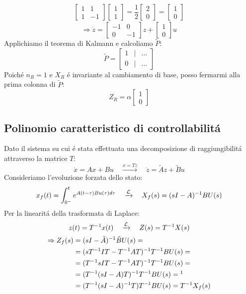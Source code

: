 \documentclass[../main.tex]{subfiles}
\begin{document}
\begin{Exercise}[title={Calcolo di $ X_R $ e decomposizione di raggiungibilit\'a}, difficulty=1]
\begin{align*}
\begin{bmatrix}
					1 & 1\\
					1 & -1
				\end{bmatrix}
				\begin{bmatrix}
					1\\
					1
				\end{bmatrix} = \dfrac{1}{2}
				\begin{bmatrix}
					2\\
					0
				\end{bmatrix}=
				\begin{bmatrix}
					1\\
					0
				\end{bmatrix}
			\end{align*}
			\[
				\Rightarrow \dot z=
				\begin{bmatrix}
					-1 & 0\\
					0 & -1
				\end{bmatrix} z +
				\begin{bmatrix}
					1\\
					0
				\end{bmatrix} u
			\]
			Applichiamo il teorema di Kalmann e calcoliamo $ \tilde P $:
			\[
				\tilde P =
				\begin{bmatrix}
					1 & | & \dots\\
					0 & | & \dots
				\end{bmatrix}
			\]
			Poich\'e $ n_R = 1 $ e $ X_R $ \'e invariante al cambiamento di base, posso fermarmi alla prima colonna di $ \tilde P $:
			\[
				Z_R = \alpha
				\begin{bmatrix}
					1\\
					0
				\end{bmatrix}
			\]
		\end{Exercise}
	
	\subsection{Polinomio caratteristico di controllabilit\'a}
		Dato il sistema su cui \'e stata effettuata una decomposizione di raggiungibilit\'a attraverso la matrice $ T $:
		\[ \dot x = Ax+Bu \quad\xrightarrow{x=Tz}\quad \dot z = \tilde Az + \tilde Bu \]
		Consideriamo l'evoluzione forzata dello stato:
		\[ x_f(t) = \int_{0^-}^{t}e^{A(t-\tau)Bu(\tau)d\tau} \quad \xrightarrow{\mathcal{L}} \quad X_f(s) = (sI-A)^{-1} B U(s) \]
		Per la linearit\'a della trasformata di Laplace:
		\[ z(t) = T^{-1} x(t) \quad \xrightarrow{\mathcal{L}} \quad Z(s) = T^{-1} X(s) \]
		\begin{align*}
			\Rightarrow Z_f(s) &= (sI-\tilde A)^{-1} \tilde B U(s) =\\
			&= (s T^{-1} I T - T^{-1} A T )^{-1} T^{-1} B U(s) =\\
			&= (T^{-1} sI T - T^{-1} A T )^{-1} T^{-1} B U(s) =\\
			&= (T^{-1} (sI-A) T)^{-1} T^{-1} B U(s) =\footnotemark\\
			&= (T^{-1} (sI-A)^{-1} T) T^{-1} B U(s) = T^{-1} X_f(s)
		\end{align*}
		
\end{document}
